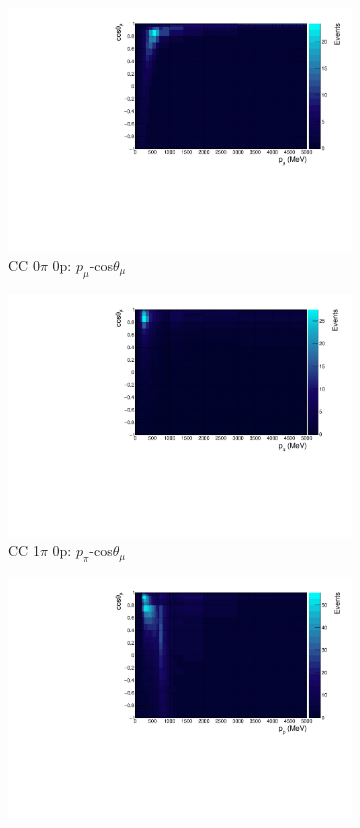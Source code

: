 \begin{figure}
\centering
\begin{subfigure}{.49\textwidth}
  \centering
  \includegraphics[width=0.9\linewidth]{figs/hptpc_sigvar_cc0pi0p.pdf}
  \caption{CC 0$\pi$ 0p: $p_{\mu}$-cos$\theta_{\mu}$}
\end{subfigure}
\begin{subfigure}{.49\textwidth}
  \centering
  \includegraphics[width=0.9\linewidth]{figs/hptpc_sigvar_cc1pi0p.pdf}
  \caption{CC 1$\pi$ 0p: $p_{\pi}$-cos$\theta_{\mu}$}
\end{subfigure}
\begin{subfigure}{.49\textwidth}
  \centering
  \includegraphics[width=0.9\linewidth]{figs/hptpc_sigvar_cc0pi1p.pdf}

\end{subfigure}
\end{figure}
